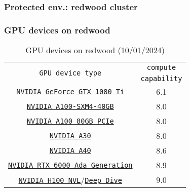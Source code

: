 \subsubsection{Protected env.: redwood cluster}
\begin{frame}
	\frametitle{GPU devices on redwood}	
\begin{table}[H]
   \begin{center}
     \begin{tabular}{c|c}
       \multirow{2}{*}{\texttt{GPU device type}} & \texttt{compute} \\
	                                               & \texttt{capability} \\
       \hline
       \href{https://www.nvidia.com/en-us/geforce/10-series/\#1080-ti-spec}{\small{\texttt{NVIDIA GeForce GTX 1080 Ti}}}    &  \small{6.1}  \\
       \href{https://www.nvidia.com/content/dam/en-zz/Solutions/Data-Center/a100/pdf/nvidia-a100-datasheet-us-nvidia-1758950-r4-web.pdf}{\small{\texttt{NVIDIA A100-SXM4-40GB}}} &  \small{8.0} \\
	     \href{https://www.nvidia.com/content/dam/en-zz/Solutions/Data-Center/a100/pdf/nvidia-a100-datasheet-us-nvidia-1758950-r4-web.pdf}{\small{\texttt{NVIDIA A100 80GB PCIe}}} &  \small{8.0} \\
	     \href{https://www.nvidia.com/content/dam/en-zz/Solutions/data-center/products/a30-gpu/pdf/a30-datasheet.pdf}{\small{\texttt{NVIDIA A30}}}   &  \small{8.0} \\
	     \href{https://images.nvidia.com/content/Solutions/data-center/a40/nvidia-a40-datasheet.pdf}{\small{\texttt{NVIDIA A40}}} &  \small{8.6} \\
	     \href{https://www.nvidia.com/content/dam/en-zz/Solutions/design-visualization/rtx-6000/proviz-print-rtx6000-datasheet-web-2504660.pdf}{\small{\texttt{NVIDIA RTX 6000 Ada Generation}}}&  \small{8.9} \\
	     \href{https://www.nvidia.com/en-us/data-center/h100/}{\texttt{NVIDIA H100 NVL}}/\href{https://www.nvidia.com/content/dam/en-zz/Solutions/Data-Center/h100/PB-11773-001\_v01.pdf}{\small{\texttt{Deep Dive}}} &  \small{9.0} \\
        \hline
     \end{tabular}
   \end{center}	   
   \caption{GPU devices on redwood (10/01/2024)}
\end{table}	   
\end{frame}	

